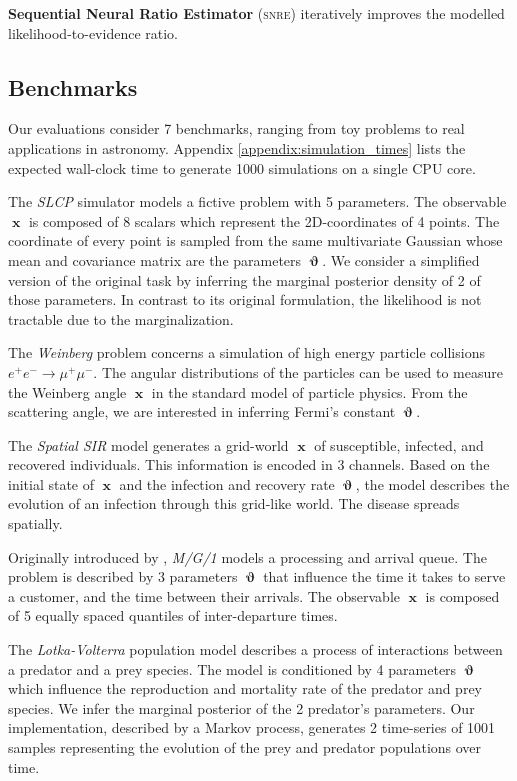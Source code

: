 \documentclass[twoside]{article}
\DeclareMathOperator{\vtheta}{\boldsymbol\vartheta}
\DeclareMathOperator{\vx}{\boldsymbol x}
\newcommand{\snre}{\textsc{snre}}
\begin{document}
{\bfseries Sequential Neural Ratio Estimator} (\snre) \citep{2019arXiv190304057H,durkan2020contrastive} iteratively improves the modelled likelihood-to-evidence ratio.
\subsection{Benchmarks}
Our evaluations consider 7 benchmarks, ranging from toy problems to real applications in astronomy. Appendix \ref{appendix:simulation_times} lists the expected wall-clock time to generate 1000 simulations on a single CPU core.

The \emph{SLCP} simulator models a fictive problem with 5 parameters. The observable $\vx$ is composed of 8 scalars which represent the 2D-coordinates of 4 points.
The coordinate of every point is sampled from the same multivariate Gaussian whose mean and covariance matrix are the parameters $\vtheta$. We consider a simplified version of the original task \citep{papamakarios2019sequential} by inferring the marginal posterior density of 2 of those parameters. In contrast to its original formulation, the likelihood is not tractable due to the marginalization.

The \emph{Weinberg} problem \citep{weinberg} concerns a simulation of high energy particle collisions $e^+e^- \to \mu^+ \mu^-$. The angular distributions of the particles can be used to measure the Weinberg angle $\vx$
in the standard model of particle physics. From the scattering angle, we are interested in inferring Fermi's constant $\vtheta$.

The \emph{Spatial SIR} model generates a grid-world $\vx$ of susceptible,
infected, and recovered individuals. This information is encoded in 3
channels. Based on the initial state of $\vx$ and the infection and recovery rate $\vtheta$,
the model describes the evolution of an infection through this grid-like world.
The disease spreads spatially.

Originally introduced by \citet{papamakarios2019sequential}, \emph{M/G/1} models a processing and arrival queue. The problem is
described by 3 parameters $\vtheta$ that influence the time it takes to serve a customer, and the time between their arrivals. The observable $\vx$ is composed of 5 equally spaced quantiles of inter-departure times.

The \emph{Lotka-Volterra} population model \citep{lotka,volterra1926fluctuations} describes a process of interactions between a predator and a prey species. The model is conditioned by 4 parameters $\vtheta$ which influence the reproduction and mortality rate of the predator and prey species. We infer the marginal posterior of the 2 predator's parameters. Our implementation, described by a Markov process, generates 2 time-series of 1001 samples representing the evolution of the prey and predator populations over time.
\end{document}
